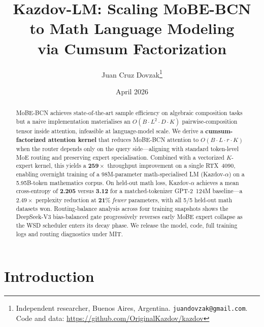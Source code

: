 \documentclass[11pt]{article}
\title{\textbf{Kazdov-LM: Scaling MoBE-BCN to Math Language Modeling\\
via Cumsum Factorization}}
\author{Juan Cruz Dovzak\thanks{Independent researcher, Buenos Aires, Argentina.
\texttt{juandovzak@gmail.com}. Code and data:
\url{https://github.com/OriginalKazdov/kazdov}}}
\date{April 2026}
\begin{document}
\maketitle

\begin{center}
\end{center}

\begin{abstract}
\noindent
MoBE-BCN \citep{dovzak2026mobebcn} achieves state-of-the-art sample
efficiency on algebraic composition tasks but a naive implementation
materialises an $O(B \cdot L^2 \cdot D \cdot K)$ pairwise-composition tensor
inside attention, infeasible at language-model scale. We derive a
\textbf{cumsum-factorized attention kernel} that reduces MoBE-BCN attention
to $O(B \cdot L \cdot r \cdot K)$ when the router depends only on the
query side---aligning with standard token-level MoE routing and preserving
expert specialisation. Combined with a vectorized $K$-expert kernel, this
yields a $\mathbf{259\times}$ throughput improvement on a single
RTX~4090, enabling overnight training of a 98M-parameter math-specialised
LM (Kazdov-$\alpha$) on a 5.95B-token mathematics corpus.
On held-out math loss, Kazdov-$\alpha$ achieves a mean cross-entropy of
\textbf{2.205} versus \textbf{3.12} for a matched-tokenizer GPT-2~124M
baseline---a $\mathbf{2.49\times}$ perplexity reduction at $\mathbf{21\%}$
\emph{fewer} parameters, with all 5/5 held-out math datasets won.
Routing-balance analysis across four training snapshots shows the
DeepSeek-V3 bias-balanced gate progressively reverses early MoBE
expert collapse as the WSD scheduler enters its decay phase.  We release
the model, code, full training logs and routing diagnostics under MIT.
\end{abstract}

\section{Introduction}
\end{document}
